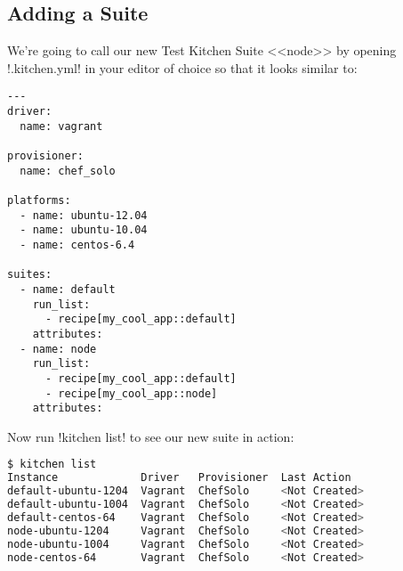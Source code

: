 \subsection{Adding a Suite}

We're going to call our new Test Kitchen Suite <<node>> by opening \inline!.kitchen.yml! in your editor of choice so that it looks similar to:

\begin{lstlisting}[label=lst:testing-test-kitchen34]
---
driver:
  name: vagrant

provisioner:
  name: chef_solo

platforms:
  - name: ubuntu-12.04
  - name: ubuntu-10.04
  - name: centos-6.4

suites:
  - name: default
    run_list:
      - recipe[my_cool_app::default]
    attributes:
  - name: node
    run_list:
      - recipe[my_cool_app::default]
      - recipe[my_cool_app::node]
    attributes:
\end{lstlisting}

Now run \inline!kitchen list! to see our new suite in action:

\begin{lstlisting}[language=Bash,label=lst:testing-test-kitchen35]
$ kitchen list
Instance             Driver   Provisioner  Last Action
default-ubuntu-1204  Vagrant  ChefSolo     <Not Created>
default-ubuntu-1004  Vagrant  ChefSolo     <Not Created>
default-centos-64    Vagrant  ChefSolo     <Not Created>
node-ubuntu-1204     Vagrant  ChefSolo     <Not Created>
node-ubuntu-1004     Vagrant  ChefSolo     <Not Created>
node-centos-64       Vagrant  ChefSolo     <Not Created>
\end{lstlisting}
